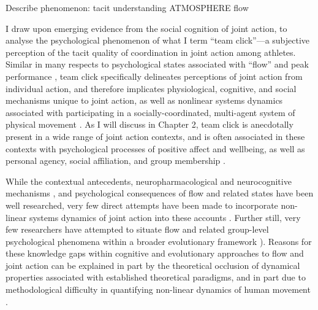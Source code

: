 Describe phenomenon:
tacit understanding
ATMOSPHERE
flow

 I draw upon emerging evidence from the social cognition of joint action, to analyse the psychological phenomenon of what I term ``team click''---a subjective perception of the tacit quality of coordination in joint action among athletes.  Similar in many respects to psychological states associated with ``flow'' and peak performance \citep{Csikszentmihalyi1992}, team click specifically delineates perceptions of joint action from individual action, and therefore implicates physiological, cognitive, and social mechanisms unique to joint action, as well as nonlinear systems dynamics associated with participating in a socially-coordinated, multi-agent system of physical movement \citep{Kelso2009}. As I will discuss in Chapter 2, team click is anecdotally present in a wide range of joint action contexts, and is often associated in these contexts with psychological processes of positive affect and wellbeing, as well as personal agency, social affiliation, and group membership \citep{Jackson1995,Marsh2009,Wheatley2012,Slingerland2014}.

While the contextual antecedents\citep{Fong2015}, neuropharmacological \citep{Boecker2008} and neurocognitive mechanisms \citep{Dietrich2004,Dietrich2011,Cheron2016}, and psychological consequences \citep{Wheatley2012} of flow and related states have been well researched, very few direct attempts have been made to incorporate non-linear systems dynamics of joint action into these accounts \citep[but see][]{Marsh2009}.  Further still, very few researchers have attempted to situate flow and related group-level psychological phenomena within a broader evolutionary framework \citep[but, for a general theoretical proposal, see][]{Slingerland2014}).  Reasons for these knowledge gaps within cognitive and evolutionary approaches to flow and joint action can be explained in part by the theoretical occlusion of dynamical properties associated with established theoretical paradigms, and in part due to methodological difficulty in quantifying non-linear dynamics of human movement \citep{Kelso2009}.

